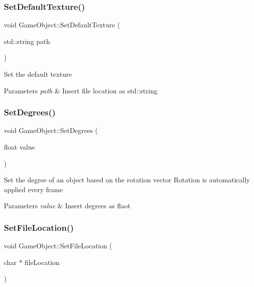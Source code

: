 \subsubsection{\texorpdfstring{SetDefaultTexture()}{SetDefaultTexture()}}
{\footnotesize\ttfamily void Game\+Object\+::\+Set\+Default\+Texture (\begin{DoxyParamCaption}\item[{std\+::string}]{path }\end{DoxyParamCaption})}

Set the default texture 
\begin{DoxyParams}{Parameters}
{\em path} & Insert file location as std\+::string \\
\hline
\end{DoxyParams}
\mbox{\label{class_game_object_a69b3551055c2a445ef736f332f798ecb}} 
\subsubsection{\texorpdfstring{SetDegrees()}{SetDegrees()}}
{\footnotesize\ttfamily void Game\+Object\+::\+Set\+Degrees (\begin{DoxyParamCaption}\item[{float}]{value }\end{DoxyParamCaption})}

Set the degree of an object based on the rotation vector Rotation is automatically applied every frame 
\begin{DoxyParams}{Parameters}
{\em value} & Insert degrees as flaot \\
\hline
\end{DoxyParams}
\mbox{\label{class_game_object_a5c7584253378347ac1a0da0909073e07}} 
\subsubsection{\texorpdfstring{SetFileLocation()}{SetFileLocation()}\hspace{0.1cm}{\footnotesize\ttfamily [1/2]}}
{\footnotesize\ttfamily void Game\+Object\+::\+Set\+File\+Location (\begin{DoxyParamCaption}\item[{char $\ast$}]{file\+Location }\end{DoxyParamCaption})}


